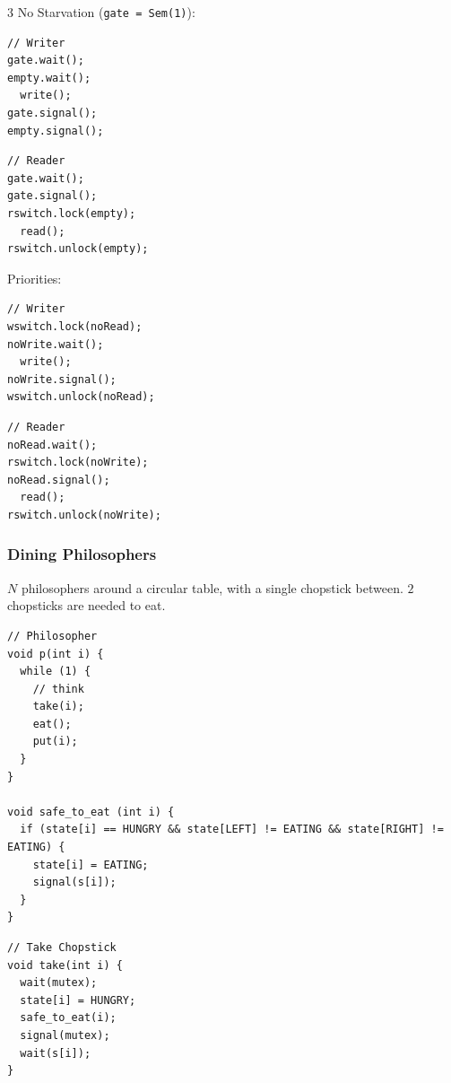 \documentclass[12pt, a4paper]{article}
\begin{document}
\begin{multicols*}{3}
No Starvation (\lstinline|gate = Sem(1)|):\\
\begin{minipage}{0.45\columnwidth}
  \begin{lstlisting}
// Writer
gate.wait();
empty.wait();
  write();
gate.signal();
empty.signal();
  \end{lstlisting}
\end{minipage}
\begin{minipage}{0.5\columnwidth}
  \begin{lstlisting}
// Reader 
gate.wait();
gate.signal();
rswitch.lock(empty);
  read();
rswitch.unlock(empty);
  \end{lstlisting}
\end{minipage}

Priorities:\\
\begin{minipage}{0.45\columnwidth}
  \begin{lstlisting}[basicstyle=\ttfamily\scriptsize]
// Writer
wswitch.lock(noRead);
noWrite.wait();
  write();
noWrite.signal();
wswitch.unlock(noRead);
  \end{lstlisting}
\end{minipage}
\begin{minipage}{0.5\columnwidth}
  \begin{lstlisting}[basicstyle=\ttfamily\scriptsize]
// Reader 
noRead.wait();
rswitch.lock(noWrite);
noRead.signal();
  read();
rswitch.unlock(noWrite);
  \end{lstlisting}
\end{minipage}


\colbreak
\subsubsection{Dining Philosophers}
$N$ philosophers around a circular table, with a single chopstick between. $2$ chopsticks are needed to eat.
\begin{minipage}{0.48\columnwidth}
  \begin{lstlisting}
// Philosopher
void p(int i) {
  while (1) {
    // think
    take(i);
    eat();
    put(i);
  }
}

void safe_to_eat (int i) {
  if (state[i] == HUNGRY && state[LEFT] != EATING && state[RIGHT] != EATING) {
    state[i] = EATING;
    signal(s[i]);
  }
}
  \end{lstlisting}
\end{minipage}
\begin{minipage}{0.45\columnwidth}
  \begin{lstlisting}
// Take Chopstick
void take(int i) {
  wait(mutex);
  state[i] = HUNGRY;
  safe_to_eat(i);
  signal(mutex);
  wait(s[i]);
}


\end{lstlisting}
\end{minipage}
\end{multicols*}
\end{document}
